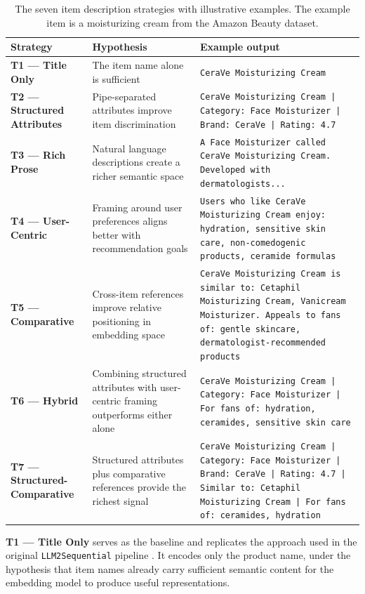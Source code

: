 \documentclass[12pt,a4paper]{report}
\begin{document}
\begin{table}[h]
\centering
\caption{The seven item description strategies with illustrative examples.
The example item is a moisturizing cream from the Amazon Beauty dataset.}
\label{tab:prompt_strategies}
\begin{tabular}{p{2.0cm} p{3.0cm} p{7.5cm}}
\toprule
\textbf{Strategy} & \textbf{Hypothesis} & \textbf{Example output} \\
\midrule
\textbf{T1 — Title Only} & The item name alone is sufficient & \texttt{CeraVe Moisturizing Cream} \\
\midrule
\textbf{T2 — Structured Attributes} & Pipe-separated attributes improve item discrimination &
\texttt{CeraVe Moisturizing Cream | Category: Face Moisturizer | Brand: CeraVe | Rating: 4.7} \\
\midrule
\textbf{T3 — Rich Prose} & Natural language descriptions create a richer semantic space &
\texttt{A Face Moisturizer called CeraVe Moisturizing Cream. Developed with dermatologists...} \\
\midrule
\textbf{T4 — User-Centric} & Framing around user preferences aligns better with recommendation goals &
\texttt{Users who like CeraVe Moisturizing Cream enjoy: hydration, sensitive skin care, non-comedogenic products, ceramide formulas} \\
\midrule
\textbf{T5 — Comparative} & Cross-item references improve relative positioning in embedding space &
\texttt{CeraVe Moisturizing Cream is similar to: Cetaphil Moisturizing Cream, Vanicream Moisturizer. Appeals to fans of: gentle skincare, dermatologist-recommended products} \\
\midrule
\textbf{T6 — Hybrid} & Combining structured attributes with user-centric framing outperforms either alone &
\texttt{CeraVe Moisturizing Cream | Category: Face Moisturizer | For fans of: hydration, ceramides, sensitive skin care} \\
\midrule
\textbf{T7 — Structured-Comparative} & Structured attributes plus comparative references provide the richest signal &
\texttt{CeraVe Moisturizing Cream | Category: Face Moisturizer | Brand: CeraVe | Rating: 4.7 | Similar to: Cetaphil Moisturizing Cream | For fans of: ceramides, hydration} \\
\bottomrule
\end{tabular}
\end{table}

\textbf{T1 — Title Only} serves as the baseline and replicates the approach
used in the original \texttt{LLM2Sequential} pipeline
\citep{boz2025}. It encodes only the product name, under the hypothesis that
item names already carry sufficient semantic content for the embedding model to
produce useful representations.
\end{document}
